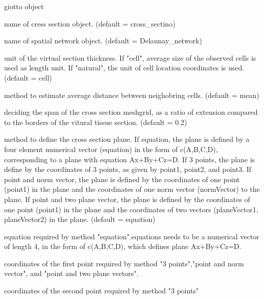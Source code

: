 \documentclass[a4paper]{book}
\begin{document}
\begin{Arguments}
\begin{ldescription}
\item[\code{gobject}] giotto object

\item[\code{name}] name of cress section object. (default = cross\_sectino)

\item[\code{spatial\_network\_name}] name of spatial network object. (default = Delaunay\_network)

\item[\code{thickness\_unit}] unit of the virtual section thickness. If "cell", average size of the observed cells is used as length unit. If "natural", the unit of cell location coordinates is used.(default = cell)

\item[\code{cell\_distance\_estimate\_method}] method to estimate average distance between neighobring cells. (default = mean)

\item[\code{extend\_ratio}] deciding the span of the cross section meshgrid, as a ratio of extension compared to the borders of the vitural tissue section. (default = 0.2)

\item[\code{method}] method to define the cross section plane.
If equation, the plane is defined by a four element numerical vector (equation) in the form of c(A,B,C,D), corresponding to a plane with equation Ax+By+Cz=D.
If 3 points, the plane is define by the coordinates of 3 points, as given by point1, point2, and point3.
If point and norm vector, the plane is defined by the coordinates of one point (point1) in the plane and the coordinates of one norm vector (normVector) to the plane.
If point and two plane vector, the plane is defined by the coordinates of one point (point1) in the plane and the coordinates of two vectors (planeVector1, planeVector2) in the plane.
(default = equation)

\item[\code{equation}] equation required by method "equation".equations needs to be a numerical vector of length 4, in the form of c(A,B,C,D), which defines plane Ax+By+Cz=D.

\item[\code{point1}] coordinates of the first point required by method "3 points","point and norm vector", and "point and two plane vectors".

\item[\code{point2}] coordinates of the second point required by method "3 points"


\end{ldescription}
\end{Arguments}
\end{document}

